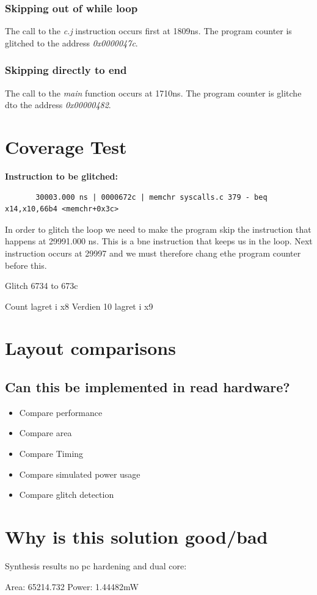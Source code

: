 \subsubsection{Skipping out of while loop}

The call to the \textit{c.j} instruction occurs first at 1809ns. The program counter is glitched to the address \textit{0x0000047c}.

\subsubsection{Skipping directly to end}

The call to the \textit{main} function occurs at 1710ns. The program counter is glitche dto the address \textit{0x00000482}.


\section{Coverage Test}
\label{sec:cov_test_result}



\textbf{Instruction to be glitched:}
\begin{lstlisting}
       30003.000 ns | 0000672c | memchr syscalls.c 379 - beq x14,x10,66b4 <memchr+0x3c>
\end{lstlisting}

In order to glitch the loop we need to make the program skip the instruction that happens at 29991.000 ns. This is a bne instruction that keeps us in the loop. Next instruction occurs at 29997 and we must therefore chang ethe program counter before this. 

Glitch 6734 to 673c

Count lagret i x8 
Verdien 10 lagret i x9

\section{Layout comparisons}

\subsection{Can this be implemented in read hardware?}
\begin{itemize}
    \item Compare performance 
    \item Compare area
    \item Compare Timing 
    \item Compare simulated power usage
    \item Compare glitch detection
\end{itemize}

\section{Why is this solution good/bad}

Synthesis results no pc hardening and dual core:

Area: 65214.732
Power: 1.44482mW
